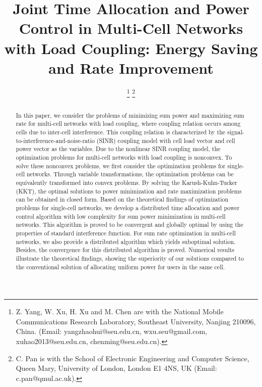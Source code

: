 \documentclass[journal]{IEEEtran}
\begin{document}
\title{Joint Time Allocation and Power Control in Multi-Cell Networks with Load Coupling: Energy Saving and Rate Improvement}



\author{
\thanks{Z. Yang, W. Xu, H. Xu and M. Chen are with the National Mobile Communications Research
Laboratory, Southeast University, Nanjing 210096, China.  (Email: yangzhaohui@seu.edu.cn, wxu.seu@gmail.com, xuhao2013@seu.edu.cn, chenming@seu.edu.cn).}
 \thanks{C. Pan is with the School of Electronic Engineering and Computer Science, Queen Mary, University of London, London E1 4NS, UK (Email: c.pan@qmul.ac.uk).}
}
\maketitle


\IEEEpeerreviewmaketitle

\begin{abstract}
In this paper, we consider the problems of minimizing sum power and maximizing sum rate for multi-cell networks with load coupling, where coupling relation occurs among cells due to inter-cell interference. This coupling relation is characterized by the signal-to-interference-and-noise-ratio (SINR) coupling model with cell load vector and cell power vector as the variables. Due to the nonlinear SINR coupling model, the optimization problems for multi-cell networks with load coupling is nonconvex. To solve these nonconvex problems, we first consider the optimization problems for single-cell networks. Through variable transformations, the optimization problems can be equivalently transformed into convex problems. By solving the Karush-Kuhn-Tucker (KKT), the optimal solutions to power minimization and rate maximization problems can be obtained in closed form. Based on the theoretical findings of optimization problems for single-cell networks, we develop a distributed time allocation and power control algorithm with low complexity for sum power minimization in multi-cell networks. This algorithm is proved to be convergent and globally optimal by using the properties of standard interference function. For sum rate optimization in multi-cell networks, we also provide a distributed algorithm which yields suboptimal solution. Besides, the convergence for this distributed algorithm is proved. Numerical results illustrate the theoretical findings, showing the superiority of our solutions compared to the conventional solution of allocating uniform power for users in the same cell.
\end{abstract}
\end{document}
